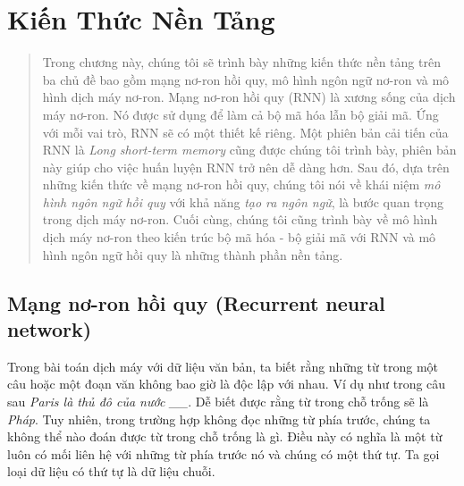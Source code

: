 \chapter{Kiến Thức Nền Tảng}
\ifpdf
    \graphicspath{{Chapter2/Chapter2Figs/PNG/}{Chapter2/Chapter2Figs/PDF/}{Chapter2/Chapter2Figs/}}
\else
    \graphicspath{{Chapter2/Chapter2Figs/EPS/}{Chapter2/Chapter2Figs/}}
\fi

\begin{quote}


Trong chương này, chúng tôi sẽ trình bày những kiến thức nền tảng trên ba chủ đề bao gồm mạng nơ-ron hồi quy, mô hình ngôn ngữ nơ-ron và mô hình dịch máy nơ-ron. Mạng nơ-ron hồi quy (RNN) là xương sống của dịch máy nơ-ron. Nó được sử dụng để làm cả bộ mã hóa lẫn bộ giải mã. Ứng với mỗi vai trò, RNN sẽ có một thiết kế riêng. Một phiên bản cải tiến của RNN là \textit{Long short-term memory} cũng được chúng tôi trình bày, phiên bản này giúp cho việc huấn luyện RNN trở nên dễ dàng hơn. Sau đó, dựa trên những kiến thức về mạng nơ-ron hồi quy, chúng tôi nói về khái niệm \textit{mô hình ngôn ngữ hồi quy} với khả năng \textit{tạo ra ngôn ngữ}, là bước quan trọng trong dịch máy nơ-ron. Cuối cùng, chúng tôi cũng trình bày về mô hình dịch máy nơ-ron theo kiến trúc bộ mã hóa - bộ giải mã với RNN và mô hình ngôn ngữ hồi quy là những thành phần nền tảng.

\end{quote}
\section{Mạng nơ-ron hồi quy (Recurrent neural network)}

Trong bài toán dịch máy với dữ liệu văn bản, ta biết rằng những từ trong một câu hoặc một đoạn văn không bao giờ là độc lập với nhau. Ví dụ như trong câu sau \textit{Paris là thủ đô của nước \_\_}. Dễ biết được rằng từ trong chỗ trống sẽ là \textit{Pháp}. Tuy nhiên, trong trường hợp không đọc những từ phía trước, chúng ta không thể nào đoán được từ trong chỗ trống là gì. Điều này có nghĩa là một từ luôn có mối liên hệ với những từ phía trước nó và chúng có một thứ tự. Ta gọi loại dữ liệu có thứ tự là dữ liệu chuỗi.

